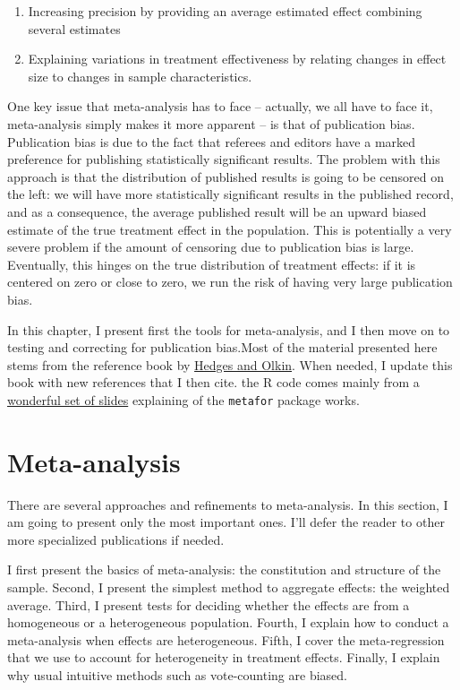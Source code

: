 \documentclass[]{book}
\providecommand{\tightlist}{%
  \setlength{\itemsep}{0pt}\setlength{\parskip}{0pt}}
\theoremstyle{definition}
\theoremstyle{definition}
\theoremstyle{definition}
\theoremstyle{remark}
\begin{document}
\begin{enumerate}
\def\labelenumi{\arabic{enumi}.}
\tightlist
\item
  Increasing precision by providing an average estimated effect
  combining several estimates
\item
  Explaining variations in treatment effectiveness by relating changes
  in effect size to changes in sample characteristics.
\end{enumerate}

One key issue that meta-analysis has to face -- actually, we all have to
face it, meta-analysis simply makes it more apparent -- is that of
publication bias. Publication bias is due to the fact that referees and
editors have a marked preference for publishing statistically
significant results. The problem with this approach is that the
distribution of published results is going to be censored on the left:
we will have more statistically significant results in the published
record, and as a consequence, the average published result will be an
upward biased estimate of the true treatment effect in the population.
This is potentially a very severe problem if the amount of censoring due
to publication bias is large. Eventually, this hinges on the true
distribution of treatment effects: if it is centered on zero or close to
zero, we run the risk of having very large publication bias.

In this chapter, I present first the tools for meta-analysis, and I then
move on to testing and correcting for publication bias.Most of the
material presented here stems from the reference book by
\href{https://www.sciencedirect.com/book/9780080570655/statistical-methods-for-meta-analysis}{Hedges
and Olkin}. When needed, I update this book with new references that I
then cite. the R code comes mainly from a
\href{http://www.edii.uclm.es/~useR-2013/Tutorials/kovalchik/kovalchik_meta_tutorial.pdf}{wonderful
set of slides} explaining of the \texttt{metafor} package works.

\section{Meta-analysis}\label{meta-analysis}

There are several approaches and refinements to meta-analysis. In this
section, I am going to present only the most important ones. I'll defer
the reader to other more specialized publications if needed.

I first present the basics of meta-analysis: the constitution and
structure of the sample. Second, I present the simplest method to
aggregate effects: the weighted average. Third, I present tests for
deciding whether the effects are from a homogeneous or a heterogeneous
population. Fourth, I explain how to conduct a meta-analysis when
effects are heterogeneous. Fifth, I cover the meta-regression that we
use to account for heterogeneity in treatment effects. Finally, I
explain why usual intuitive methods such as vote-counting are biased.
\end{document}
